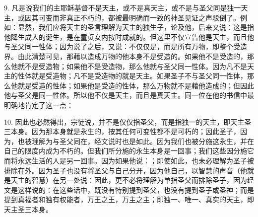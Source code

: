 9. 凡是说我们的主耶稣基督不是天主，或不是真天主，或不是与圣父同是独一天主，或因其可变而非真正不朽的，都被最明确而一致的神圣见证之声驳倒了。例如：显然，我们应将天主的圣言理解为天主的独生子，论及他，后来又说：这是指他降生成人的诞生，是在童贞女内按时成就的。但这里不仅宣告他是天主，而且他与圣父同一性体；因为说了之后，又说：不仅仅是，而是所有万物，即整个受造界。由此清楚可见，那藉以造成万物的他本身不是受造的。如果他不是受造的，那么他就不是受造物；如果他不是受造物，那么他就与圣父同一性体。因为凡不是天主的性体就是受造物；凡不是受造物的就是天主。如果圣子不与圣父同一性体，那么他就是受造的性体；如果他是受造的性体，那么万物就不是藉他造成的；但因此他与圣父是同一性体。所以他不仅是天主，而且是真天主。同一位在他的书信中最明确地肯定了这一点：\par

10. 因此也必然得出，宗徒说，并不是仅仅指圣父，而是指独一的天主，即天主圣三本身。因为那本身就是永生的，按其任何可变性都不是可朽的；因此圣子，因为，也被理解为与圣父同在，经文说时也是如此。因为我们也被分施这永生，并在自己的限度内成为不朽的。但我们所分施的永生本身是一回事；我们这些因分施它而将永远生活的人是另一回事。因为如果他说：；即使如此，也未必理解为圣子被排除在外。因为圣子也没有将圣父与自己分开，因为他自己，以智慧的声音（他就是天主的智慧）在另一处说：因此，更不必将理解为单指圣父而排除圣子，因为经文是这样说的：在这些话中，既没有特别提到圣父，也没有提到圣子或圣神；而是提到真福者和独有权能者，万王之王，万主之主；即独一、唯一、真实的天主，即天主圣三本身。\par

